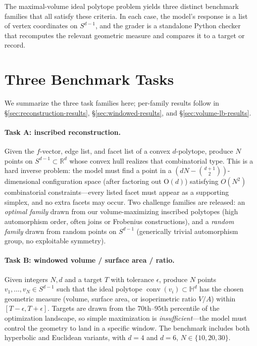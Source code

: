 \documentclass[11pt]{article}
\begin{document}
The maximal-volume ideal polytope problem yields three distinct
benchmark families that all satisfy these criteria.  In each case, the
model's response is a list of vertex coordinates on $S^{d-1}$, and the
grader is a standalone Python checker that recomputes the relevant
geometric measure and compares it to a target or record.

\section{Three Benchmark Tasks}

We summarize the three task families here; per-family results follow
in \S\ref{sec:reconstruction-results}, \S\ref{sec:windowed-results},
and \S\ref{sec:volume-lb-results}.

\paragraph{Task A: inscribed reconstruction.}
Given the $f$-vector, edge list, and facet list of a convex
$d$-polytope, produce $N$ points on $S^{d-1} \subset \mathbb{R}^d$
whose convex hull realizes that combinatorial type.  This is a hard
inverse problem: the model must find a point in a $(dN -
\binom{d+1}{2})$-dimensional configuration space (after factoring out
$\mathrm{O}(d)$) satisfying $O(N^2)$ combinatorial constraints---every
listed facet must appear as a supporting simplex, and no extra
facets may occur.  Two challenge families are released: an
\emph{optimal family} drawn from our volume-maximizing inscribed
polytopes (high automorphism order, often joins or Frobenius
constructions), and a \emph{random family} drawn from random points
on $S^{d-1}$ (generically trivial automorphism group, no exploitable
symmetry).

\paragraph{Task B: windowed volume / surface area / ratio.}
Given integers $N, d$ and a target $T$ with tolerance $\epsilon$,
produce $N$ points $v_1, \ldots, v_N \in S^{d-1}$ such that the
ideal polytope $\operatorname{conv}(v_i) \subset \mathbb{H}^d$ has
the chosen geometric measure (volume, surface area, or isoperimetric
ratio $V/A$) within $[T - \epsilon, T + \epsilon]$.  Targets are
drawn from the $70$th--$95$th percentile of the optimization
landscape, so simple maximization is \emph{insufficient}---the model
must control the geometry to land in a specific window.  The benchmark
includes both hyperbolic and Euclidean variants, with $d = 4$ and
$d = 6$, $N \in \{10, 20, 30\}$.
\end{document}
